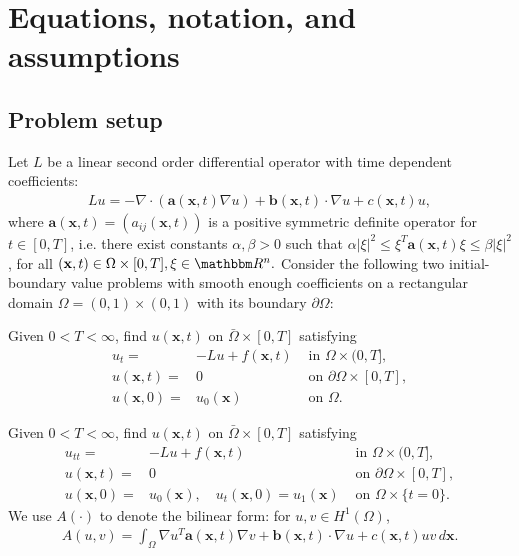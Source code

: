 \documentclass[onefignum,onetabnum]{siamart171218}
\begin{document}
\section{Equations, notation, and assumptions}
\label{sec-preliminaries}


\subsection{Problem setup}
Let $L$ be a linear  second order differential operator with time dependent coefficients:
\begin{align*}
Lu = -\nabla\cdot(\mathbf a(\mathbf x,t)\nabla u) + \mathbf b(\mathbf x,t)\cdot \nabla u + c(\mathbf x,t)u,
\end{align*} 
 where $\mathbf a(\mathbf x,t)=(a_{ij}(\mathbf x,t))$ is a positive symmetric definite operator for $t\in [0,T]$, i.e. there exist constants $\alpha,\beta >0$ such that $\alpha |\xi|^2\leq \xi^T \mathbf a(\mathbf x,t) \xi \leq \beta |\xi|^2$,
for all $(\mathbf x,t)\in \Omega\times[0,T], \xi \in \mathbbm R^n.$ 
Consider the following two initial-boundary value problems with smooth enough coefficients on 
a rectangular domain  $\Omega=(0,1)\times(0,1)$ with its boundary  $\partial \Omega$: 

Given $0<T<\infty$, find $u( \mathbf x,t)$ on $\bar \Omega \times [0,T]$ satisfying
\begin{equation}\label{heat-equation-homo-bc}
\begin{aligned}
u_t
 = & -Lu + f(\mathbf x,t) & \text{ in } \Omega \times (0,T], \\
u(\mathbf x,t)  = & 0 &\text{ on } \partial\Omega \times [0,T], \\
u(\mathbf x,0) = & u_0(\mathbf x) &\text{ on } \Omega.
\end{aligned}
\end{equation}

Given $0<T<\infty$, find $u(\mathbf x,t)$ on $\bar \Omega \times [0,T]$ satisfying  
\begin{equation}\label{wave-equation-homo-bc}
\begin{aligned}
u_{tt}
 = & -Lu + f(\mathbf x,t) & \text{ in } \Omega \times (0,T], \\
u(\mathbf x,t)  = & 0 &\text{ on } \partial\Omega \times [0,T], \\
u(\mathbf x,0) = & u_0(\mathbf x) ,\quad u_t(\mathbf x,0) = u_1(\mathbf x) &\text{ on } \Omega\times\{t=0\}.
\end{aligned}
\end{equation}
  We use $A(\cdot)$ to denote the   bilinear form: for $u,v \in H^1(\Omega)$,
\begin{align}\label{nonsymmetric-bilinearform}
A(u,v) = \int_{\Omega}\nabla u^T \mathbf a(\mathbf x,t)\nabla v+ \mathbf b(\mathbf x,t)\cdot \nabla u + c(\mathbf x,t)uv \, d\mathbf x. 
\end{align}
 
\end{document}
